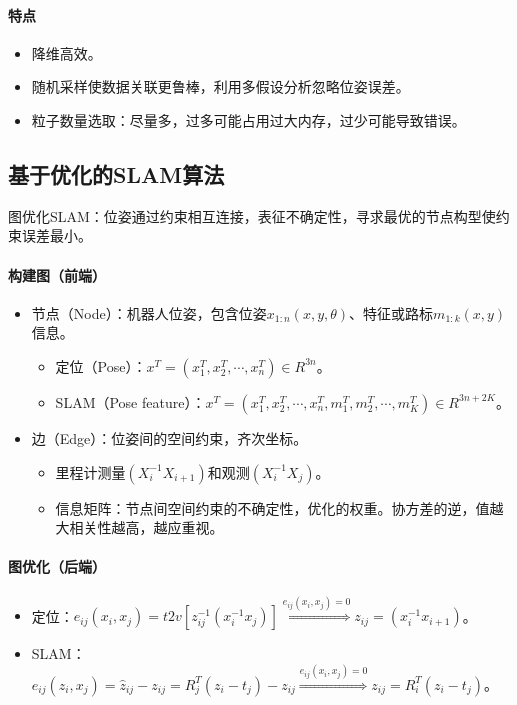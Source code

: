 \documentclass[
12pt, %
a4paper, 
oneside, %
headinclude,footinclude, %
]{scrartcl}
\begin{document}
\paragraph{特点}
\begin{itemize}
\item 降维高效。
\item 随机采样使数据关联更鲁棒，利用多假设分析忽略位姿误差。
\item 粒子数量选取：尽量多，过多可能占用过大内存，过少可能导致错误。
\end{itemize}
\subsection[基于优化的SLAM算法]{基于优化的SLAM算法}
图优化SLAM：位姿通过约束相互连接，表征不确定性，寻求最优的节点构型使约束误差最小。
\paragraph{构建图（前端）}
\begin{itemize}
\item 节点（Node）：机器人位姿，包含位姿$ x_{1:n}(x, y ,\theta) $、特征或路标$ m_{1:k}(x, y) $信息。
\begin{itemize}
\item 定位（Pose）：$ x^T = (x_1^T, x_2^T, \cdots, x_n^T) \in R^{3n} $。
\item SLAM（Pose feature）：$ x^T = (x_1^T, x_2^T, \cdots, x_n^T, m_1^T, m_2^T, \cdots, m_K^T) \in R^{3n + 2K} $。
\end{itemize}
\item 边（Edge）：位姿间的空间约束，齐次坐标。
\begin{itemize}
\item 里程计测量$ (X_i^{-1}X_{i + 1}) $和观测$ (X_i^{-1}X_j) $。
\item 信息矩阵：节点间空间约束的不确定性，优化的权重。协方差的逆，值越大相关性越高，越应重视。
\end{itemize}
\end{itemize}
\paragraph{图优化（后端）}
\begin{itemize}
\item 定位：$ e_{ij}(x_i, x_j) = t2v[z_{ij}^{-1}(x_i^{-1}x_j)] \overset{e_{ij}(x_i, x_j) = 0}{\Longrightarrow} z_{ij} = (x_i^{-1}x_{i + 1}) $。
\item SLAM：$ e_{ij}(z_i, x_j) = \hat{z}_{ij} - z_{ij} = R_j^T(z_i - t_j) - z_{ij} \overset{e_{ij}(x_i, x_j) = 0}{\Longrightarrow} z_{ij} = R_i^T(z_i - t_j) $。
\end{itemize}
\end{document}
